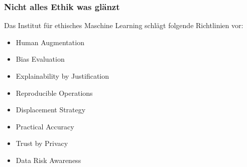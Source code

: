 \documentclass[aspectratio=169,xcolor=dvipsnames]{beamer}
\begin{document}
\begin{frame}[fragile]
\frametitle{Nicht alles Ethik was glänzt}
\begin{center}
Das Institut für ethisches Maschine Learning schlägt folgende Richtlinien vor:
\end{center}
\medskip

\large
\setlength{\leftmargini}{150pt}
\begin{itemize}[label=\textcolor{RedOrange}{\textbullet}]
\item Human Augmentation
\item Bias Evaluation
\item Explainability by Justification 
\item Reproducible Operations
\item Displacement Strategy
\item Practical Accuracy
\item Trust by Privacy
\item Data Risk Awareness
\end{itemize}
\end{frame}


\begin{frame}
\end{frame}

\end{document}
